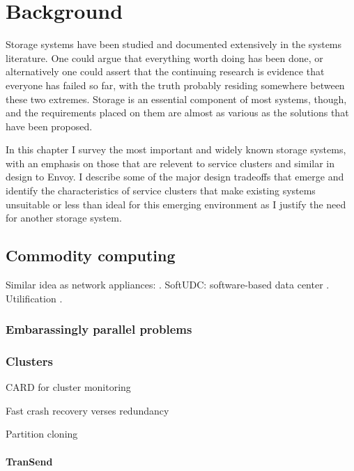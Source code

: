 \chapter{Background}

Storage systems have been studied and documented extensively in the systems literature. One could argue that everything worth doing has been done, or alternatively one could assert that the continuing research is evidence that everyone has failed so far, with the truth probably residing somewhere between these two extremes. Storage is an essential component of most systems, though, and the requirements placed on them are almost as various as the solutions that have been proposed.

In this chapter I survey the most important and widely known storage systems, with an emphasis on those that are relevent to service clusters and similar in design to Envoy. I describe some of the major design tradeoffs that emerge and identify the characteristics of service clusters that make existing systems unsuitable or less than ideal for this emerging environment as I justify the need for another storage system.

\section{Commodity computing}



Similar idea as network appliances: \cite{sapuntzakis03}. SoftUDC: software-based data center \cite{kallahalla}. Utilification \cite{wilkes04}.

\subsection{Embarassingly parallel problems}

\subsection{Clusters}
CARD for cluster monitoring\cite{anderson97}

Fast crash recovery verses redundancy\cite{baker94}

Partition cloning \cite{rauch}

\subsubsection{TranSend}

